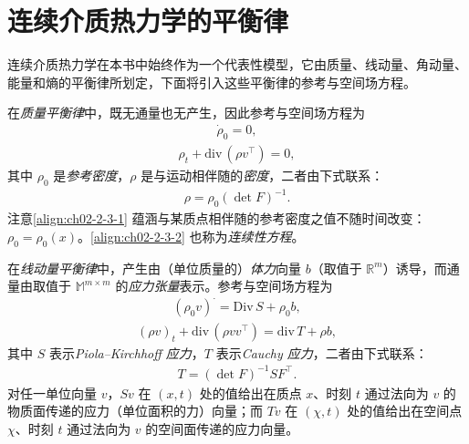 ﻿\documentclass[../../main.tex]{subfiles}
\begin{document}
\section{连续介质热力学的平衡律}\label{section:ch02-连续介质热力学平衡律}

连续介质热力学在本书中始终作为一个代表性模型，它由质量、线动量、角动量、能量和熵的平衡律所划定，下面将引入这些平衡律的参考与空间场方程。

在\emph{质量平衡律}中，既无通量也无产生，因此参考与空间场方程为
\begin{align}
\dot{\rho}_{0}=0,
\label{align:ch02-2-3-1}
\end{align}
\begin{align}
\rho_{t}+\mathrm{div}\,(\rho v^{\top})=0,
\label{align:ch02-2-3-2}
\end{align}
其中 $\rho_{0}$ 是\emph{参考密度}，$\rho$ 是与运动相伴随的\emph{密度}，二者由下式联系：
\begin{align}
\rho=\rho_{0}(\det F)^{-1}.
\label{align:ch02-2-3-3}
\end{align}
注意\eqref{align:ch02-2-3-1} 蕴涵与某质点相伴随的参考密度之值不随时间改变：$\rho_{0}=\rho_{0}(x)$。\eqref{align:ch02-2-3-2} 也称为\emph{连续性方程}。

在\emph{线动量平衡律}中，产生由（单位质量的）\emph{体力}向量 $b$（取值于 $\mathbb{R}^{m}$）诱导，而通量由取值于 $\mathbb{M}^{m\times m}$ 的\emph{应力张量}表示。参考与空间场方程为
\begin{align}
(\rho_{0}v)^{\cdot}=\mathrm{Div}\,S+\rho_{0}b,
\label{align:ch02-2-3-4}
\end{align}
\begin{align}
(\rho v)_{t}+\mathrm{div}\,(\rho vv^{\top})=\mathrm{div}\,T+\rho b,
\label{align:ch02-2-3-5}
\end{align}
其中 $S$ 表示\emph{Piola--Kirchhoff 应力}，$T$ 表示\emph{Cauchy 应力}，二者由下式联系：
\begin{align}
T=(\det F)^{-1}SF^{\top}.
\label{align:ch02-2-3-6}
\end{align}
对任一单位向量 $v$，$S v$ 在 $(x,t)$ 处的值给出在质点 $x$、时刻 $t$ 通过法向为 $v$ 的物质面传递的应力（单位面积的力）向量；而 $T v$ 在 $(\chi,t)$ 处的值给出在空间点 $\chi$、时刻 $t$ 通过法向为 $v$ 的空间面传递的应力向量。
\end{document}
